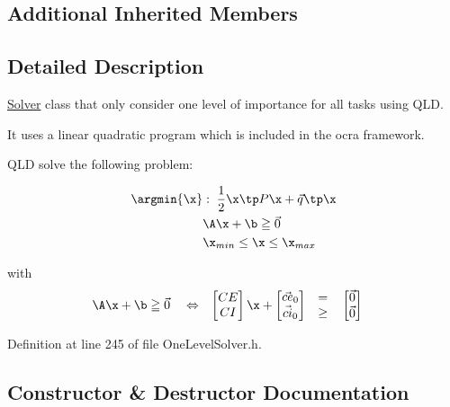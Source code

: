 \subsection*{Additional Inherited Members}


\subsection{Detailed Description}
\hyperlink{classocra_1_1Solver}{Solver} class that only consider one level of importance for all tasks using Q\+LD. 

It uses a linear quadratic program which is included in the ocra framework.

Q\+LD solve the following problem\+:

\begin{align*} \argmin{\x} &: \; \frac{1}{2} \x\tp P \x + \vec{q}\tp \x \\ & \A \x + \b \geqq \vec{0} \\ & \x_{min} \leq \x \leq \x_{max} \end{align*}

with \begin{align*} \A \x + \b &\geqq \vec{0} & &\Leftrightarrow &\begin{bmatrix} CE \\ CI \end{bmatrix} \x + \begin{bmatrix} \vec{ce}_0 \\ \vec{ci}_0 \end{bmatrix} & \quad \begin{matrix} = \\ \geq \end{matrix} \quad \begin{bmatrix} \vec{0} \\ \vec{0} \end{bmatrix} \end{align*} 

Definition at line 245 of file One\+Level\+Solver.\+h.



\subsection{Constructor \& Destructor Documentation}
